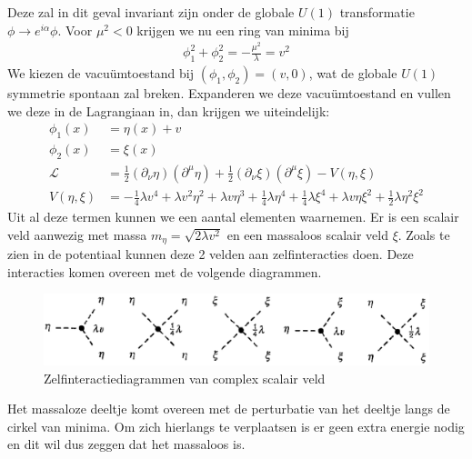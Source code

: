 \documentclass[../main.tex]{subfiles}
\begin{document}
Deze zal in dit geval invariant zijn onder de globale $U(1)$ transformatie $\phi \rightarrow e^{i\alpha}\phi$. Voor $\mu^2<0$ krijgen we nu een ring van minima bij
\begin{equation}
    \begin{aligned}
        \label{eq:complex_symm_breking}
        \phi_1^2+\phi_2^2 = -\frac{\mu^2}{\lambda} =v^2
    \end{aligned}
\end{equation}
We kiezen de vacuümtoestand bij $(\phi_1, \phi_2) = (v,0)$, wat de globale $U(1)$ symmetrie spontaan zal breken. Expanderen we deze vacuümtoestand en vullen we deze in de Lagrangiaan in, dan krijgen we uiteindelijk:
\begin{equation}
    \begin{aligned}
        \label{eq:comple_scalair_veld_symm_breking}
        \phi_1(x) &= \eta(x) + v\\
        \phi_2(x) &= \xi(x)\\
        \mathcal{L} &= \frac{1}{2} (\partial_\nu \eta) (\partial^\mu \eta) + \frac{1}{2} (\partial_\nu \xi) (\partial^\mu \xi) - V(\eta, \xi)\\
        V(\eta, \xi) &= -\frac{1}{4} \lambda v^4 + \lambda v^2 \eta^2 + \lambda v \eta^3 + \frac{1}{4} \lambda \eta^4 + \frac{1}{4} \lambda \xi^4 + \lambda v \eta\xi^2 + \frac{1}{2} \lambda \eta^2\xi^2
    \end{aligned}
\end{equation}
Uit al deze termen kunnen we een aantal elementen waarnemen. Er is een scalair veld aanwezig met massa $m_\eta = \sqrt{2\lambda v^2}$ en een massaloos scalair veld $\xi$. Zoals te zien in de potentiaal kunnen deze 2 velden aan zelfinteracties doen. Deze interacties komen overeen met de volgende diagrammen.

\begin{figure}[h]
    \centering
    \includegraphics[width=0.8\linewidth]{higgs_boson/complex_scalair_veld_int.png}
    \caption{Zelfinteractiediagrammen van complex scalair veld}%
    \label{fig:higgs_boson/complex_scalair_veld_int}
\end{figure}

Het massaloze deeltje komt overeen met de perturbatie van het deeltje langs de cirkel van minima. Om zich hierlangs te verplaatsen is er geen extra energie nodig en dit wil dus zeggen dat het massaloos is.
\end{document}
